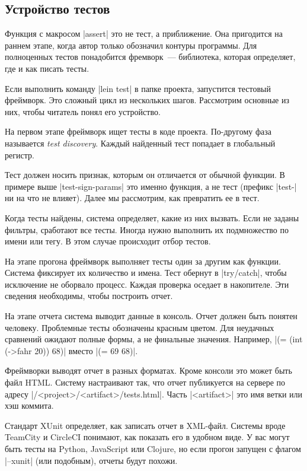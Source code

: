 \subsection{Устройство тестов}

Функция с макросом \spverb|assert| это не тест, а приближение. Она пригодится на
раннем этапе, когда автор только обозначил контуры программы. Для полноценных
тестов понадобится фремворк~--- библиотека, которая определяет, где и как писать
тесты.

Если выполнить команду \spverb|lein test| в папке проекта, запустится тестовый
фреймворк. Это сложный цикл из нескольких шагов. Рассмотрим основные из них,
чтобы читатель понял его устройство.

На первом этапе фреймворк ищет тесты в коде проекта. По-другому фаза называется
\emph{test discovery}. Каждый найденный тест попадает в глобальный регистр.

Тест должен носить признак, которым он отличается от обычной функции. В примере
выше \spverb|test-sign-params| это именно функция, а не тест (префикс
\spverb|test-| ни на что не влияет). Далее мы рассмотрим, как превратить ее в
тест.

Когда тесты найдены, система определяет, какие из них вызвать. Если не заданы
фильтры, сработают все тесты. Иногда нужно выполнить их подмножество по имени
или тегу. В этом случае происходит отбор тестов.

На этапе прогона фреймворк выполняет тесты один за другим как функции. Система
фиксирует их количество и имена. Тест обернут в \spverb|try/catch|, чтобы
исключение не оборвало процесс. Каждая проверка оседает в накопителе. Эти
сведения необходимы, чтобы построить отчет.

На этапе отчета система выводит данные в консоль. Отчет должен быть понятен
человеку. Проблемные тесты обозначены красным цветом. Для неудачных сравнений
ожидают полные формы, а не финальные значения. Например,
\spverb|(= (int (->fahr 20)) 68)| вместо \spverb|(= 69 68)|.

Фреймворки выводят отчет в разных форматах. Кроме консоли это может быть файл
HTML. Систему настраивают так, что отчет публикуется на сервере по адресу
\spverb|/<project>/<artifact>/tests.html|. Часть \spverb|<artifact>| это имя
ветки или хэш коммита.

Стандарт XUnit определяет, как записать отчет в XML-файл. Системы вроде TeamCity
и CircleCI понимают, как показать его в удобном виде. У вас могут быть тесты на
Python, JavaScript или Clojure, но если прогон запущен с флагом \spverb|--xunit|
(или подобным), отчеты будут похожи.

